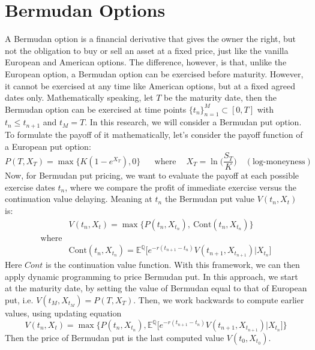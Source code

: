 \documentclass{article}
\begin{document}
\section{Bermudan Options}
A Bermudan option is a financial
 derivative that gives the owner the right, but not the obligation to buy or sell an asset at a fixed price, just like the vanilla European and American options. The difference, however, is that, unlike the European option, a Bermudan option can be exercised before maturity. However, it cannot be exercised at any time like American options, but at a fixed agreed dates only. Mathematically speaking, let $T$ be the maturity date, then the Bermudan option can be exercised at time points $\{ t_n\}_{n=1}^M \subset [0,T]$ with $t_{n} \leq t_{n+1}$ and $t_M = T$. In this research, we will consider a Bermudan put option. To formulate the payoff of it mathematically, let's consider the payoff function of a European put option:
 $$
 P(T,X_T) = \max\{K(1-e^{X_T}),0 \} \ \ \ \quad\text{where} \ \quad X_T=\ln \big( \frac{S_T}{K} \big) \quad (\text{log-moneyness})
 $$
 Now, for Bermudan put pricing, we want to evaluate the payoff at each possible exercise dates $t_n$, where we compare the profit of immediate exercise versus the continuation value delaying. Meaning at $t_n$ the Bermudan put value $V(t_n, X_t)$ is:
\begin{align}
    & V(t_n, X_t) = \max \{ P(t_n, X_{t_n}), \ \text{Cont}(t_n, X_{t_n})  \} \\
\text{where}
    \\
& \text{Cont}(t_n, X_{t_n}) = \mathbb{E}^{\mathbb{Q}} \Big[ e^{-r(t_{n+1}-t_n)} V(t_{n+1}, X_{t_{n+1}}) \Big| X_{t_n}   \Big]
\end{align}
Here $Cont$ is the continuation value function. With this framework, we can then apply dynamic programming to price Bermudan put. In this approach, we start at the maturity date, by setting the value of Bermudan equal to that of European put, i.e. $V(t_M, X_{t_M})=P(T, X_T)$. Then, we work backwards to compute earlier values, using updating equation
$$
V(t_n, X_t) = \max \{ P(t_n, X_{t_n}), \mathbb{E}^{\mathbb{Q}} \Big[ e^{-r(t_{n+1}-t_n)} V(t_{n+1}, X_{t_{n+1}}) \Big| X_{t_n}   \Big]  \} 
$$
Then the price of Bermudan put is the last computed value $V(t_0, X_{t_0})$.
\end{document}
